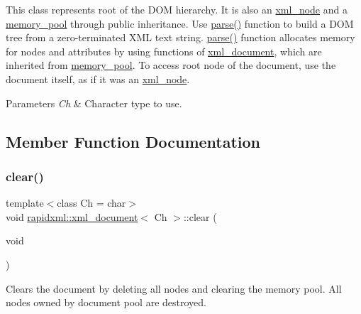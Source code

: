 This class represents root of the D\+OM hierarchy. It is also an \hyperlink{classrapidxml_1_1xml__node}{xml\+\_\+node} and a \hyperlink{classrapidxml_1_1memory__pool}{memory\+\_\+pool} through public inheritance. Use \hyperlink{classrapidxml_1_1xml__document_a9376748d5782a60bbe17307ac96f2e93}{parse()} function to build a D\+OM tree from a zero-\/terminated X\+ML text string. \hyperlink{classrapidxml_1_1xml__document_a9376748d5782a60bbe17307ac96f2e93}{parse()} function allocates memory for nodes and attributes by using functions of \hyperlink{classrapidxml_1_1xml__document}{xml\+\_\+document}, which are inherited from \hyperlink{classrapidxml_1_1memory__pool}{memory\+\_\+pool}. To access root node of the document, use the document itself, as if it was an \hyperlink{classrapidxml_1_1xml__node}{xml\+\_\+node}. 
\begin{DoxyParams}{Parameters}
{\em Ch} & Character type to use. \\
\hline
\end{DoxyParams}


\subsection{Member Function Documentation}
\mbox{\label{classrapidxml_1_1xml__document_a826929ff54242532198701f19ff5f83f}} 
\subsubsection{\texorpdfstring{clear()}{clear()}}
{\footnotesize\ttfamily template$<$class Ch  = char$>$ \\
void \hyperlink{classrapidxml_1_1xml__document}{rapidxml\+::xml\+\_\+document}$<$ Ch $>$\+::clear (\begin{DoxyParamCaption}\item[{void}]{ }\end{DoxyParamCaption})\hspace{0.3cm}{\ttfamily [inline]}}

Clears the document by deleting all nodes and clearing the memory pool. All nodes owned by document pool are destroyed. \mbox{\label{classrapidxml_1_1xml__document_a9376748d5782a60bbe17307ac96f2e93}} 

